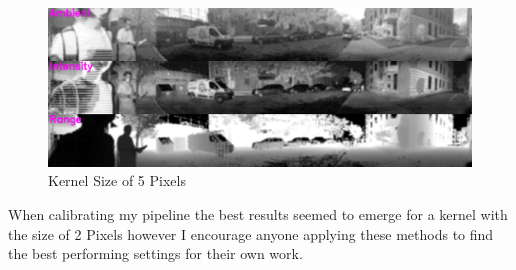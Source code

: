 \begin{figure}[ht]
    \centering
    \includegraphics[scale = 0.19]{images/smoothing/5blur.png}
    \caption{Kernel Size of 5 Pixels}
\end{figure}

When calibrating my pipeline the best results seemed to emerge for a kernel with the size of 2 Pixels however I encourage anyone applying these methods to find the best performing settings for their own work.